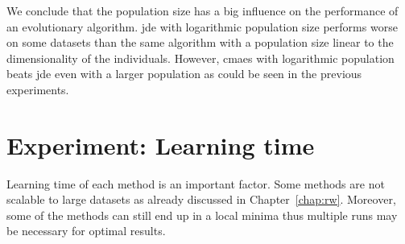 \documentclass[12pt,a4paper]{report}
\begin{document}
We conclude that the population size has a big influence on the performance of an evolutionary algorithm. \ac{jde} with logarithmic population size performs worse on some datasets than the same algorithm with a population size linear to the dimensionality of the individuals. However, \ac{cmaes} with logarithmic population beats \ac{jde} even with a larger population as could be seen in the previous experiments.


\section{Experiment: Learning time} \label{chap:exp:learning-times}

Learning time of each method is an important factor. Some methods are not scalable to large datasets as already discussed in Chapter~\ref{chap:rw}. Moreover, some of the methods can still end up in a local minima thus multiple runs may be necessary for optimal results.
\end{document}
